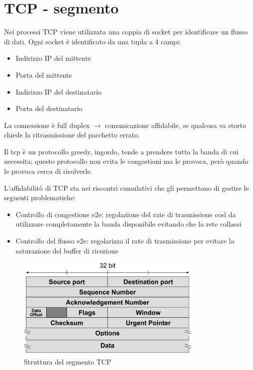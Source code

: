 \newpage
\section{TCP - segmento}
Nei processi TCP viene utilizzata una coppia di socket per identificare un flusso di dati. Ogni socket è identificato da una tupla a 4 campi:
\begin{multicols}{2}
\begin{itemize}
    \item Indirizzo IP del mittente
    \item Porta del mittente
    \item Indirizzo IP del destinatario
    \item Porta del destinatario
\end{itemize}
\end{multicols}

La connessione è full duplex $\rightarrow$ comunicazione affidabile, se qualcosa va storto chiede la ritrasmissione del pacchetto errato.

Il tcp è un protocollo greedy, ingordo, tende a prendere tutta la banda di cui necessita; questo protocollo non evita le congestioni ma le provoca, però quando le provoca cerca di risolverle.

L'affidabilitò di TCP sta nei riscontri cumulativi che gli permettono di gestire le seguenti problematiche:
\begin{itemize}
    \item Controllo di congestione e2e: regolazione del rate di trasmissione così da utilizzare completamente la banda disponibile evitando che la rete collassi
    \item Controllo del flusso e2e: regolarizza il rate di trasmissione per evitare la saturazione del buffer di ricezione
\end{itemize}

\begin{figure}[h!]
    \centering
    \includegraphics[width=0.8\textwidth]{images/segmento_tcp.png}
    \caption{Struttura del segmento TCP}
    \label{fig:segmentotcp}
\end{figure}

